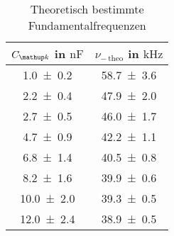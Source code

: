 \begin{table} 
\centering 
\caption{Theoretisch bestimmte Fundamentalfrequenzen} 
\label{fig:teilb_frequenzen_theo} 
\begin{tabular}{S S } 
	\toprule  
{$C\ua{k}$ in $\si{\nano\farad}$} &{$\nu_{-\,\mathup{theo}}$ in $\si{\kilo\hertz}$}  \\ 
\midrule  
 \num{1.0\pm0.2} & \num{58.7\pm3.6}\\ 
\num{2.2\pm0.4} & \num{47.9\pm2.0} \\ 
\num{2.7\pm0.5} & \num{46.0\pm1.7}\\ 
\num{4.7\pm0.9} & \num{42.2\pm1.1}\\ 
\num{6.8\pm1.4} & \num{40.5\pm0.8}\\ 
\num{8.2\pm1.6} & \num{39.9\pm0.6}\\ 
\num{10.0\pm2.0} & \num{39.3\pm0.5}\\ 
\num{12.0\pm2.4} & \num{38.9\pm0.5}\\ 
\bottomrule 
\end{tabular} 
\end{table}
